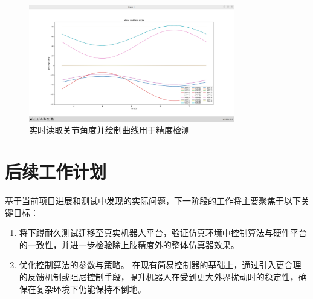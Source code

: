 \documentclass{ctexart}
\begin{document}
\begin{figure}[H]
      \centering
      \includegraphics[width = 0.8\textwidth]{plotter.png}
      \caption{实时读取关节角度并绘制曲线用于精度检测}
\end{figure}

\section{后续工作计划}

基于当前项目进展和测试中发现的实际问题，下一阶段的工作将主要聚焦于以下关键目标：

\begin{enumerate}
    \item 将下蹲耐久测试迁移至真实机器人平台，验证仿真环境中控制算法与硬件平台的一致性，并进一步检验除上肢精度外的整体仿真器效果。  
    
    \item 优化控制算法的参数与策略。  
    在现有简易控制器的基础上，通过引入更合理的反馈机制或阻尼控制手段，提升机器人在受到更大外界扰动时的稳定性，确保在复杂环境下仍能保持不倒地。  
\end{enumerate}
\end{document}
